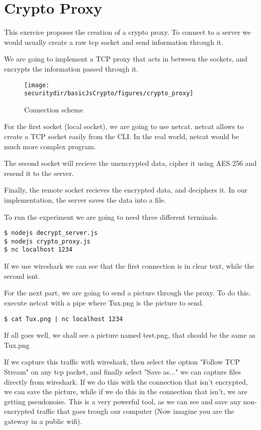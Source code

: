 \section{Crypto Proxy}
This exercice proposes the creation of a crypto proxy. To connect to a server we would usually create a raw tcp socket and send information through it. 

We are going to implement a TCP proxy that acts in between the sockets, and encrypts the information passed through it.

\begin{figure}[htb]
	\begin{centering}
		\texttt{[image: \\securitydir/basicJsCrypto/figures/crypto\_proxy]}
		\par\end{centering}
	\caption{\label{fig:crypto_proxy} Connection scheme}
\end{figure}


For the first socket (local socket), we are going to use netcat. netcat allows to create a TCP socket easily from the CLI. In the real world, netcat would be much more complex program.

The second socket will recieve the unencrypted data, cipher it using AES 256 and resend it to the server.

Finally, the remote socket recieves the encrypted data, and deciphers it. In our implementation, the server saves the data into a file.

To run the experiment we are going to need three different terminals.

\begin{lstlisting}[style=terms]
$ nodejs decrypt_server.js
$ nodejs crypto_proxy.js
$ nc localhost 1234
\end{lstlisting}


If we use wireshark we can see that the first connection is in clear text, while the second isnt.

For the next part, we are going to send a picture through the proxy. To do this, execute netcat with a pipe where Tux.png is the picture to send.

\begin{lstlisting}[style=terms]
$ cat Tux.png | nc localhost 1234
\end{lstlisting}

If all goes well, we shall see a picture named test.png, that should be the same as Tux.png

If we capture this traffic with wireshark, then select the option "Follow TCP Stream" on any tcp packet, and finally select "Save as..." we can capture files directly from wireshark. If we do this with the connection that isn't encrypted, we can save the picture, while if we do this in the connection that isn't, we are getting pseudonoise. This is a very powerful tool, as we can see and save any non-encrypted traffic that goes trough our computer (Now imagine you are the gateway in a public wifi).


